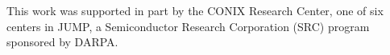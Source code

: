 \documentclass[acmsmall,review]{acmart}\settopmatter{printfolios=true,printccs=false,printacmref=false}
\begin{document}
\begin{acks}                            %
This work was supported in part by the CONIX Research Center, one of six centers in JUMP, a Semiconductor Research Corporation (SRC) program sponsored by DARPA.
\end{acks}



\end{document}
